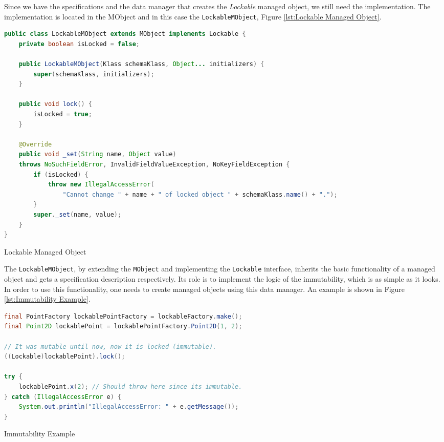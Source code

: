 Since we have the specifications and the data manager that creates the \textit{Lockable} managed object, we still need the implementation.
The implementation is located in the MObject and in this case the \texttt{LockableMObject}, Figure \ref{lst:Lockable Managed Object}.

\begin{sourcecode} [H]
	\begin{lstlisting}[language=Java, escapechar=|]
public class LockableMObject extends MObject implements Lockable {
	private boolean isLocked = false;

	public LockableMObject(Klass schemaKlass, Object... initializers) {
		super(schemaKlass, initializers);
	}

	public void lock() {
		isLocked = true;
	}

	@Override
	public void _set(String name, Object value) 
	throws NoSuchFieldError, InvalidFieldValueException, NoKeyFieldException {
		if (isLocked) {
	    	throw new IllegalAccessError(
	    		"Cannot change " + name + " of locked object " + schemaKlass.name() + ".");
		}
		super._set(name, value);
	}
}
	\end{lstlisting}
	\caption{Lockable Managed Object}
	\label{lst:Lockable Managed Object}
\end{sourcecode}

The \texttt{LockableMObject}, by extending the \texttt{MObject} and implementing the \texttt{Lockable} interface, inherits the basic functionality of a managed object and gets a specification description respectively.
Its role is to implement the logic of the immutability, which is as simple as it looks.
In order to use this functionality, one needs to create managed objects using this data manager.
An example is shown in Figure \ref{lst:Immutability Example}.

\begin{sourcecode} [H]
	\begin{lstlisting}[language=Java, escapechar=|]
final PointFactory lockablePointFactory = lockableFactory.make();
final Point2D lockablePoint = lockablePointFactory.Point2D(1, 2);

// It was mutable until now, now it is locked (immutable).
((Lockable)lockablePoint).lock();

try {
	lockablePoint.x(2); // Should throw here since its immutable.
} catch (IllegalAccessError e) {
	System.out.println("IllegalAccessError: " + e.getMessage());
}
	\end{lstlisting}
	\caption{Immutability Example}
	\label{lst:Immutability Example}
\end{sourcecode}

